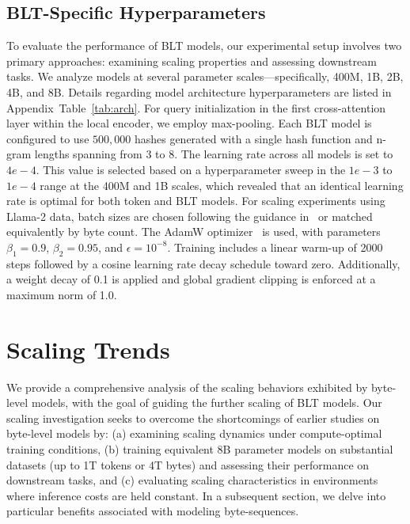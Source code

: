 \subsection{{\textsc BLT}-Specific Hyperparameters} To evaluate the performance of {\textsc BLT} models, our experimental setup involves two primary approaches: examining scaling properties and assessing downstream tasks. We analyze models at several parameter scales—specifically, 400M, 1B, 2B, 4B, and 8B. Details regarding model architecture hyperparameters are listed in Appendix~Table~\ref{tab:arch}. For query initialization in the first cross-attention layer within the local encoder, we employ max-pooling. Each {\textsc BLT} model is configured to use $500,000$ hashes generated with a single hash function and n-gram lengths spanning from 3 to 8. The learning rate across all models is set to $4e-4$. This value is selected based on a hyperparameter sweep in the $1e-3$ to $1e-4$ range at the 400M and 1B scales, which revealed that an identical learning rate is optimal for both token and {\textsc BLT} models. For scaling experiments using Llama-2 data, batch sizes are chosen following the guidance in~\cite{dubey2024llama} or matched equivalently by byte count. The AdamW optimizer~\citep{adamw} is used, with parameters $\beta_1 = 0.9$, $\beta_2 = 0.95$, and $\epsilon=10^{-8}$. Training includes a linear warm-up of 2000 steps followed by a cosine learning rate decay schedule toward zero. Additionally, a weight decay of 0.1 is applied and global gradient clipping is enforced at a maximum norm of 1.0.

\section{Scaling Trends}
\label{section:scaling}

We provide a comprehensive analysis of the scaling behaviors exhibited by byte-level models, with the goal of guiding the further scaling of {\textsc BLT} models. Our scaling investigation seeks to overcome the shortcomings of earlier studies on byte-level models by: (a) examining scaling dynamics under compute-optimal training conditions, (b) training equivalent 8B parameter models on substantial datasets (up to 1T tokens or 4T bytes) and assessing their performance on downstream tasks, and (c) evaluating scaling characteristics in environments where inference costs are held constant. In a subsequent section, we delve into particular benefits associated with modeling byte-sequences.

